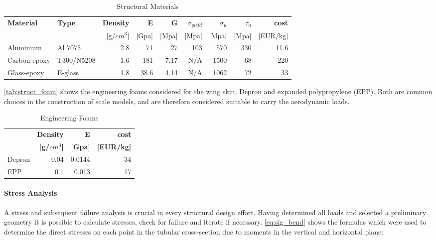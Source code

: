 \begin{table}[htbp]
  \centering
  \caption{Structural Materials \cite{callister}}
    \begin{tabular}{llrrrrrrr}
    \toprule
    \bfseries Material  &\bfseries Type  &\bfseries Density &\bfseries E     &\bfseries G     &\bfseries $\sigma_{yield}$ &\bfseries $\sigma_u$ &\bfseries $\tau_u$ &\bfseries cost \\
          &       & [g/$cm^3$] & [Gpa] & [Mpa] & [Mpa] & [Mpa] & [Mpa] & [EUR/kg] \\
    \midrule
    Aluminium & Al 7075 & 2.8   & 71    & 27    & 103   & 570   & 330   & 11.6 \\
    Carbon-epoxy & T300/N5208  & 1.6   & 181   & 7.17  & N/A   & 1500  & 68    & 220 \\
    Glass-epoxy & E-glass & 1.8   & 38.6  & 4.14  & N/A   & 1062  & 72    & 33 \\
    \bottomrule
    \end{tabular}%
  \label{tab:struct_materials}%
\end{table}%

\autoref{tab:struct_foam} shows the engineering foams considered for the wing skin, Depron and expanded polypropylene (EPP). Both are common choices in the construction of scale models, and are therefore considered suitable to carry the aerodynamic loads.

\begin{table}[htbp]
  \centering
  \caption{Engineering Foams}
    \begin{tabular}{lrrr}
    \toprule
          &\bfseries Density &\bfseries E     &\bfseries cost \\
          &\bfseries [g/$cm^3$] &\bfseries [Gpa] &\bfseries [EUR/kg] \\
    \midrule
    Depron & 0.04  & 0.0144 & 34 \\
    EPP   & 0.1   & 0.013 & 17 \\
    \bottomrule
    \end{tabular}%
  \label{tab:struct_foam}%
\end{table}%


\paragraph{Stress Analysis}

A stress and subsequent failure analysis is crucial in every structural design effort. Having determined all loads and selected a preliminary geometry it is possible to calculate stresses, check for failure and iterate if necessary. \autoref{eq:sig_bend} shows the formulas which were used to determine the direct stresses on each point in the tubular cross-section due to moments in the vertical and horizontal plane:


